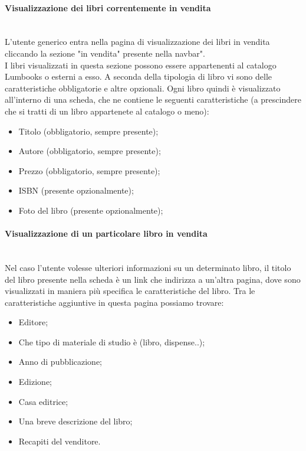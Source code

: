 \paragraph{Visualizzazione dei libri correntemente in vendita}\mbox{}\\
\label{par:VisLibriVendita}
L'utente generico entra nella pagina di visualizzazione dei libri in vendita cliccando la sezione "in vendita" presente nella navbar".\\
I libri visualizzati in questa sezione possono essere appartenenti al catalogo Lumbooks o esterni a esso. A seconda della tipologia di libro vi sono delle caratteristiche obbligatorie e altre opzionali. Ogni libro quindi è visualizzato all'interno di una scheda, che ne contiene le seguenti caratteristiche (a prescindere che si tratti di un libro appartenete al catalogo o meno):
\begin{itemize}
	\item Titolo (obbligatorio, sempre presente);
	\item Autore (obbligatorio, sempre presente);
	\item Prezzo (obbligatorio, sempre presente);
	\item ISBN (presente opzionalmente);
	\item Foto del libro (presente opzionalmente);
\end{itemize}

\paragraph{Visualizzazione di un particolare libro in vendita}\mbox{}\\
\label{par:SpecLibro}
Nel caso l'utente volesse ulteriori informazioni su un determinato libro, il titolo del libro presente nella scheda è un link che indirizza a un'altra pagina, dove sono visualizzati in maniera più specifica le caratteristiche del libro. Tra le caratteristiche aggiuntive in questa pagina possiamo trovare:
\begin{itemize}
	\item Editore;
	\item Che tipo di materiale di studio è (libro, dispense..);
	\item Anno di pubblicazione;
	\item Edizione;
	\item Casa editrice;
	\item Una breve descrizione del libro;
	\item Recapiti del venditore.
\end{itemize}


